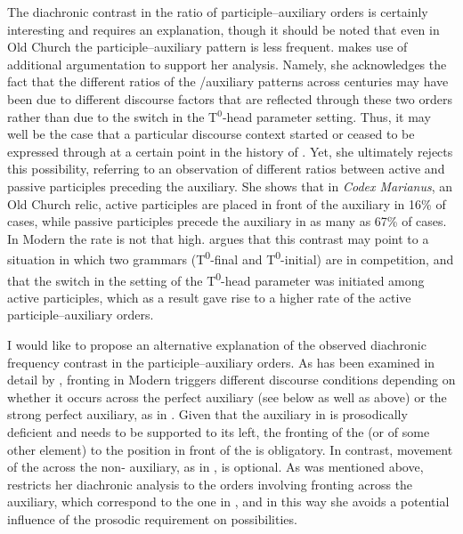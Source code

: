 \documentclass[output=paper,modfonts,newtxmath,hidelinks]{langscibook}
\begin{document}
The diachronic contrast in the ratio of participle--auxiliary orders is certainly interesting and requires an explanation, though it should be noted that even in Old Church  the participle--auxiliary pattern is less frequent. \citet{pancheva2008} makes use of additional argumentation to support her analysis. Namely, she acknowledges the fact that the different ratios of the /auxiliary patterns across centuries may have been due to different discourse factors that are reflected through these two orders rather than due to the switch in the T$^0$-head parameter setting. Thus, it may well be the case that a particular discourse context started or ceased to be expressed through  at a certain point in the history of . Yet, she ultimately rejects this possibility, referring to an observation of different ratios between active and passive participles preceding the auxiliary. She shows that in \textit{Codex Marianus}, an Old Church  relic, active participles are placed in front of the auxiliary in 16\% of cases, while passive participles precede the auxiliary in as many as 67\% of cases. In Modern  the rate is not that high. \citeauthor{pancheva2008} argues that this contrast may point to a situation in which two grammars (T\textsuperscript{0}{}-final and T\textsuperscript{0}{}-initial) are in competition, and that the switch in the setting of the T\textsuperscript{0}{}-head parameter was initiated among active participles, which as a result gave rise to a higher rate of the active participle--auxiliary orders.

I would like to propose an alternative explanation of the observed diachronic frequency contrast in the participle--auxiliary orders. As has been examined in detail by \citet{lambova2003},  fronting in Modern  triggers different discourse conditions depending on whether it occurs across the  perfect auxiliary  (see  below as well as  above) or the strong  perfect auxiliary, as in . Given that the auxiliary in  is prosodically deficient and needs to be supported to its left, the fronting of the  (or of some other element) to the position in front of the  is obligatory. In contrast, movement of the  across the non- auxiliary, as in , is optional. As was mentioned above, \citeauthor{pancheva2008} restricts her diachronic analysis to the orders involving  fronting across the  auxiliary, which correspond to the one in , and in this way she avoids a potential influence of the  prosodic requirement on  possibilities.
\end{document}
